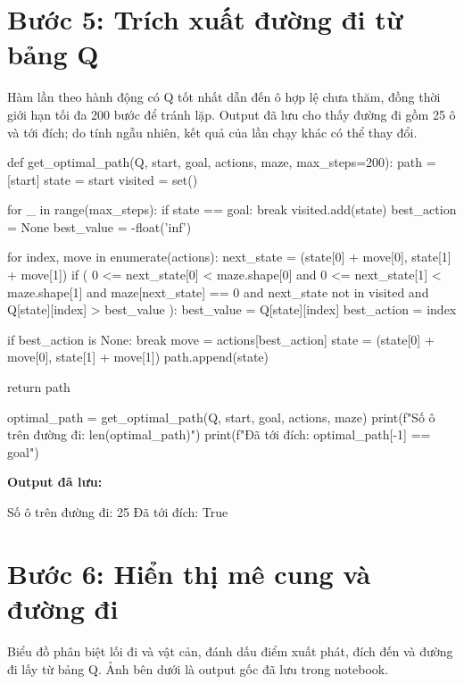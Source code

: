 \documentclass[12pt,a4paper]{report}
\begin{document}
\section{Bước 5: Trích xuất đường đi từ bảng Q}
Hàm lần theo hành động có Q tốt nhất dẫn đến ô hợp lệ chưa thăm, đồng thời giới hạn tối đa 200 bước để tránh lặp. Output đã lưu cho thấy đường đi gồm 25 ô và tới đích; do tính ngẫu nhiên, kết quả của lần chạy khác có thể thay đổi.

\begin{Code}
def get_optimal_path(Q, start, goal, actions, maze, max_steps=200):
    path = [start]
    state = start
    visited = set()

    for _ in range(max_steps):
        if state == goal:
            break
        visited.add(state)
        best_action = None
        best_value = -float('inf')

        for index, move in enumerate(actions):
            next_state = (state[0] + move[0], state[1] + move[1])
            if (
                0 <= next_state[0] < maze.shape[0]
                and 0 <= next_state[1] < maze.shape[1]
                and maze[next_state] == 0
                and next_state not in visited
                and Q[state][index] > best_value
            ):
                best_value = Q[state][index]
                best_action = index

        if best_action is None:
            break
        move = actions[best_action]
        state = (state[0] + move[0], state[1] + move[1])
        path.append(state)

    return path


optimal_path = get_optimal_path(Q, start, goal, actions, maze)
print(f"Số ô trên đường đi: {len(optimal_path)}")
print(f"Đã tới đích: {optimal_path[-1] == goal}")
\end{Code}
\noindent\textbf{Output đã lưu:}
\begin{Output}
Số ô trên đường đi: 25
Đã tới đích: True
\end{Output}

\section{Bước 6: Hiển thị mê cung và đường đi}
Biểu đồ phân biệt lối đi và vật cản, đánh dấu điểm xuất phát, đích đến và đường đi lấy từ bảng Q. Ảnh bên dưới là output gốc đã lưu trong notebook.
\end{document}
